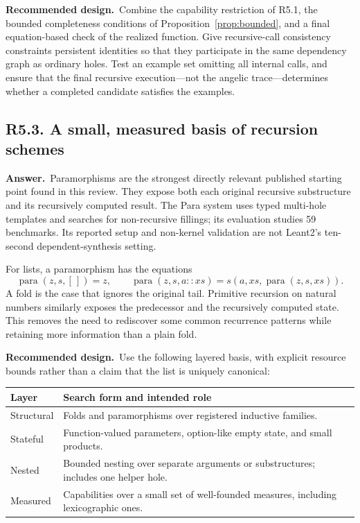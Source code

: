 \documentclass[11pt,a4paper]{article}
\newcommand{\qid}[3]{\subsection{#2. #3}\label{#1}}
\newcommand{\answer}{\noindent\textbf{Answer.}\ }
\newcommand{\proposal}{\noindent\textbf{Recommended design.}\ }
\theoremstyle{remark}
\begin{document}
\proposal Combine the capability restriction of R5.1, the bounded completeness conditions of Proposition~\ref{prop:bounded}, and a final equation-based check of the realized function. Give recursive-call consistency constraints persistent identities so that they participate in the same dependency graph as ordinary holes. Test an example set omitting all internal calls, and ensure that the final recursive execution---not the angelic trace---determines whether a completed candidate satisfies the examples.

\qid{q53}{R5.3}{A small, measured basis of recursion schemes}
\answer Paramorphisms are the strongest directly relevant published starting point found in this review. They expose both each original recursive substructure and its recursively computed result. The Para system uses typed multi-hole templates and searches for non-recursive fillings; its evaluation studies 59 benchmarks. Its reported setup and non-kernel validation are not Leant2's ten-second dependent-synthesis setting.~\cite{para}

For lists, a paramorphism has the equations
\[
 \operatorname{para}(z,s,[\,])=z,\qquad
 \operatorname{para}(z,s,a::xs)
   =s(a,xs,\operatorname{para}(z,s,xs)).
\]
A fold is the case that ignores the original tail. Primitive recursion on natural numbers similarly exposes the predecessor and the recursively computed state. This removes the need to rediscover some common recurrence patterns while retaining more information than a plain fold.

\proposal Use the following layered basis, with explicit resource bounds rather than a claim that the list is uniquely canonical:
\begin{center}
\begin{tabularx}{\textwidth}{@{}P{32mm}Y@{}}
\toprule
Layer & Search form and intended role\\
\midrule
Structural & Folds and paramorphisms over registered inductive families.\\
Stateful & Function-valued parameters, option-like empty state, and small products.\\
Nested & Bounded nesting over separate arguments or substructures; includes one helper hole.\\
Measured & Capabilities over a small set of well-founded measures, including lexicographic ones.\\
\bottomrule
\end{tabularx}
\end{center}
\end{document}
